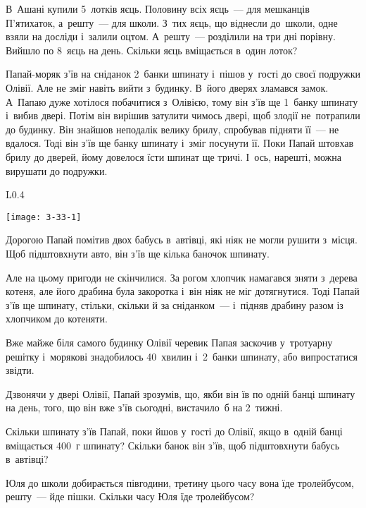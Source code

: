 \problem
В~Ашані купили 5~лотків яєць.
Половину всіх яєць~--- для мешканців П'ятихаток, а~решту~--- для школи.
З~тих яєць, що віднесли до~школи, одне взяли на досліди і~залили оцтом.
А~решту~--- розділили на три дні порівну. Вийшло по 8~яєць на день.
Скільки яєць вміщається в~один лоток? 


\problem
Папай-моряк з’їв на сніданок 2~банки шпинату і~пішов у~гості до своєї
подружки Олівії. Але не зміг навіть вийти з~будинку. В~його дверях
зламався замок. А~Папаю дуже хотілося побачитися з~Олівією, тому він
з’їв ще 1~банку шпинату і~вибив двері. Потім він вирішив затулити
чимось двері, щоб злодії не~потрапили до будинку. Він знайшов неподалік
велику брилу, спробував підняти її~--- не вдалося. Тоді він з’їв ще банку
шпинату і~зміг посунути її. Поки Папай штовхав брилу до дверей, йому
довелося їсти шпинат ще тричі. І~ось, нарешті, можна вирушати до подружки.

\begin{wrapfigure}{L}{0.4\textwidth}
  \vspace{-15pt}
  \begin{center}
    \texttt{[image: 3-33-1]}
  \end{center}
  \vspace{-15pt}
\end{wrapfigure}

Дорогою Папай помітив двох бабусь в~автівці, які ніяк не могли рушити
з~місця. Щоб підштовхнути авто, він з’їв ще кілька баночок шпинату.

Але на цьому пригоди не скінчилися. За рогом хлопчик намагався зняти
з~дерева котеня, але його драбина була закоротка і~він ніяк не міг
дотягнутися. Тоді Папай з’їв ще шпинату, стільки, скільки й
за сніданком~--- і~підняв драбину разом із хлопчиком до котеняти.

Вже майже біля самого будинку Олівії черевик Папая заскочив у~тротуарну
решітку і~морякові знадобилось 40~хвилин і~2~банки шпинату,
або випростатися звідти.

Дзвонячи у двері Олівії, Папай зрозумів, що, якби він їв по одній
банці шпинату на день, того, що він вже з’їв сьогодні,
вистачило~б на 2~тижні.

Скільки шпинату з’їв Папай, поки йшов у~гості до Олівії, якщо в~одній
банці вміщається 400~г шпинату?
Скільки банок він з’їв, щоб підштовхнути бабусь в~автівці?


\problem
Юля до школи добирається півгодини,
третину цього часу вона їде тролейбусом, решту~--- йде пішки.
Скільки часу Юля їде тролейбусом?


